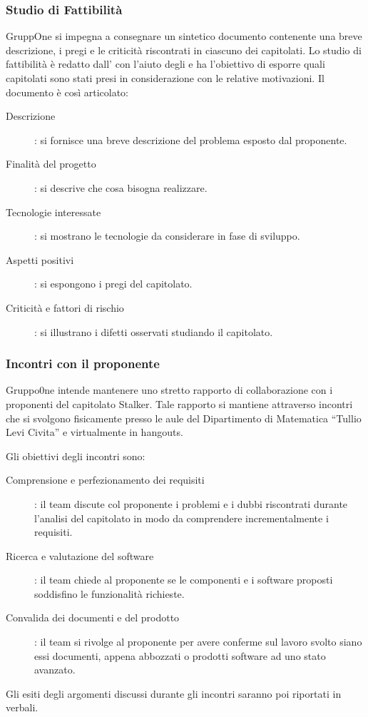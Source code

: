 \documentclass[../norme-di-progetto.tex]{subfiles}
\begin{document}
\subsubsection{Studio di Fattibilità}%
\label{subs:studio_di_fattibilita}
GruppOne si impegna a consegnare un sintetico documento contenente una breve descrizione, i pregi e le criticità riscontrati in ciascuno dei capitolati. Lo studio di fattibilità è redatto dall'
con l'aiuto degli  e ha l'obiettivo di esporre quali capitolati sono stati presi in considerazione con le relative motivazioni. Il documento è così articolato:
\begin{description}
\item [Descrizione]: si fornisce una breve descrizione del problema esposto dal proponente.
\item [Finalità del progetto]: si descrive che cosa bisogna realizzare.
\item [Tecnologie interessate]: si mostrano le tecnologie da considerare in fase di sviluppo.
\item [Aspetti positivi]: si espongono i pregi del capitolato.
\item [Criticità e fattori di rischio]: si illustrano i difetti osservati studiando il capitolato.
\end{description}

\subsubsection{Incontri con il proponente}%
\label{subs:incontri_con_il_proponente}

Gruppo0ne intende mantenere uno stretto rapporto di collaborazione con i proponenti del capitolato Stalker. Tale rapporto si mantiene attraverso incontri che si svolgono fisicamente presso le aule del Dipartimento di Matematica ``Tullio Levi Civita'' e virtualmente in hangouts.

Gli obiettivi degli incontri sono:
\begin{description}
\item [Comprensione e perfezionamento dei requisiti]: il team discute col proponente i problemi e i dubbi riscontrati durante l'analisi del capitolato in modo da comprendere incrementalmente i requisiti.
\item [Ricerca e valutazione del software]: il team chiede al proponente se le componenti e i software proposti soddisfino le funzionalità richieste.
\item [Convalida dei documenti e del prodotto]: il team si rivolge al proponente per avere conferme sul lavoro svolto siano essi documenti,  appena abbozzati o prodotti software ad uno stato avanzato.
\end{description}
Gli esiti degli argomenti discussi durante gli incontri saranno poi riportati in verbali.
\end{document}
